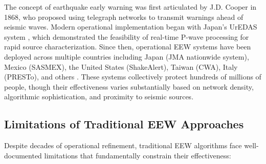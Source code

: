 \documentclass[review,authoryear]{elsarticle}
\begin{document}
The concept of earthquake early warning was first articulated by J.D. Cooper in 1868, who proposed using telegraph networks to transmit warnings ahead of seismic waves. Modern operational implementation began with Japan's UrEDAS system \citep{nakamura1988urgency}, which demonstrated the feasibility of real-time P-wave processing for rapid source characterization. Since then, operational EEW systems have been deployed across multiple countries including Japan (JMA nationwide system), Mexico (SASMEX), the United States (ShakeAlert), Taiwan (CWA), Italy (PRESTo), and others \citep{gasparini2007earthquake, given2018revised, hsiao2009development, espinosa1995mexico, zollo2014presto, allen2009status}. These systems collectively protect hundreds of millions of people, though their effectiveness varies substantially based on network density, algorithmic sophistication, and proximity to seismic sources.

\subsection{Limitations of Traditional EEW Approaches}

Despite decades of operational refinement, traditional EEW algorithms face well-documented limitations that fundamentally constrain their effectiveness:
\end{document}
